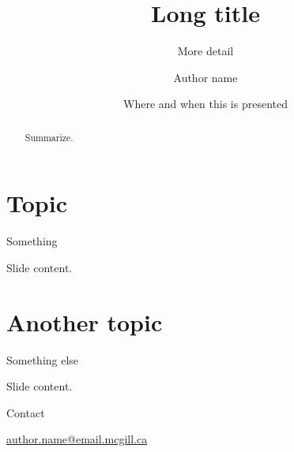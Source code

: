 \documentclass[11pt]{beamer}
\begin{document}
 
\title[Short title]{Long title}
\subtitle{More detail}
\author{Author name}
\date{Where and when this is presented}


\frame{\titlepage}

\begin{frame}
  \begin{abstract}
    Summarize.
  \end{abstract}
\end{frame}

\section{Topic}

\begin{frame}{Something}
  
  Slide content.
  
\end{frame}

\section{Another topic}

\begin{frame}{Something else}
  
  Slide content.
  
\end{frame}

\begin{frame}{Contact}

  \begin{center}
    
    \url{author.name@email.mcgill.ca}
    
    \medskip
    
    
  \end{center}
  
\end{frame}
\end{document}
